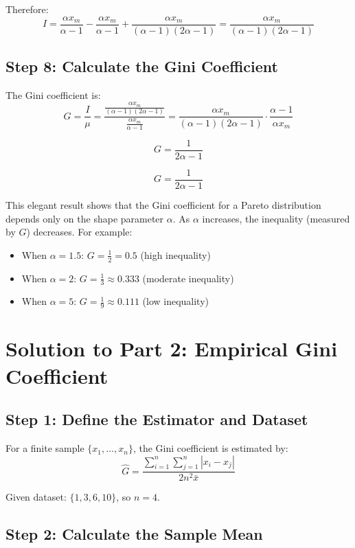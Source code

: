 \documentclass[12pt,a4paper]{article}
\theoremstyle{definition}
\begin{document}
Therefore:
\[
I = \frac{\alpha x_m}{\alpha - 1} - \frac{\alpha x_m}{\alpha - 1} + \frac{\alpha x_m}{(\alpha - 1)(2\alpha - 1)} = \frac{\alpha x_m}{(\alpha - 1)(2\alpha - 1)}
\]

\subsection{Step 8: Calculate the Gini Coefficient}

The Gini coefficient is:
\[
G = \frac{I}{\mu} = \frac{\frac{\alpha x_m}{(\alpha - 1)(2\alpha - 1)}}{\frac{\alpha x_m}{\alpha - 1}} = \frac{\alpha x_m}{(\alpha - 1)(2\alpha - 1)} \cdot \frac{\alpha - 1}{\alpha x_m}
\]

\[
G = \frac{1}{2\alpha - 1}
\]

\begin{tcolorbox}[colback=green!5!white,colframe=resultcolor,title=Result for Part 1]
\[
\boxed{G = \frac{1}{2\alpha - 1}}
\]

This elegant result shows that the Gini coefficient for a Pareto distribution depends only on the shape parameter $\alpha$. As $\alpha$ increases, the inequality (measured by $G$) decreases. For example:
\begin{itemize}
    \item When $\alpha = 1.5$: $G = \frac{1}{2} = 0.5$ (high inequality)
    \item When $\alpha = 2$: $G = \frac{1}{3} \approx 0.333$ (moderate inequality)
    \item When $\alpha = 5$: $G = \frac{1}{9} \approx 0.111$ (low inequality)
\end{itemize}
\end{tcolorbox}

\section{Solution to Part 2: Empirical Gini Coefficient}

\subsection{Step 1: Define the Estimator and Dataset}

For a finite sample $\{x_1, \ldots, x_n\}$, the Gini coefficient is estimated by:
\[
\hat{G} = \frac{\sum_{i=1}^n \sum_{j=1}^n |x_i - x_j|}{2n^2 \bar{x}}
\]

Given dataset: $\{1, 3, 6, 10\}$, so $n = 4$.

\subsection{Step 2: Calculate the Sample Mean}
\end{document}
